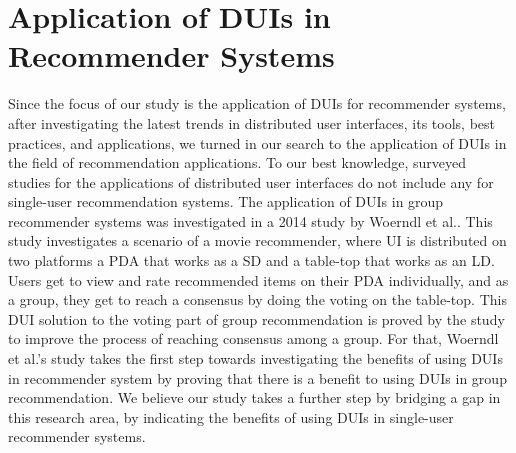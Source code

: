 \section{Application of DUIs in Recommender Systems}
Since the focus of our study is the application of DUIs for recommender
systems, after investigating the latest trends in distributed user interfaces,
its tools, best practices, and applications, we turned in our search to the application of DUIs in the field of recommendation applications. To our best knowledge,
surveyed studies for the applications of distributed user interfaces do not
include any for single-user recommendation systems. The application of DUIs in
group recommender systems was investigated in a 2014 study by Woerndl et
al.\cite{worndlvoting}. This study investigates a scenario of a movie
recommender, where UI is distributed on two platforms a PDA that works as a SD
and a table-top that works as an LD. Users get to view and rate recommended
items on their PDA individually, and as a group, they get to reach a
consensus by doing the voting on the table-top. This DUI solution to the
voting part of group recommendation is proved by the study to improve the
process of reaching consensus among a group. For that, Woerndl et al.'s study
takes the first step towards investigating the benefits of using DUIs in recommender
system by proving that there is a benefit to using DUIs in group recommendation.
We believe our study takes a further step by bridging a gap in this research
area, by indicating the benefits of using DUIs in
single-user recommender systems.
